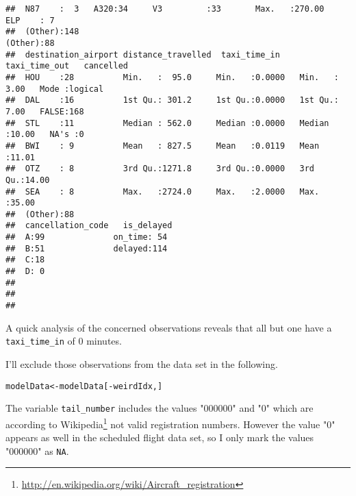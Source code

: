 \documentclass{article}\usepackage[]{graphicx}\usepackage[]{color}
\makeatletter
\newcommand{\hlopt}[1]{\textcolor[rgb]{0,0,0}{#1}}%
\newcommand{\hlstd}[1]{\textcolor[rgb]{0.345,0.345,0.345}{#1}}%
\newcommand{\hlkwb}[1]{\textcolor[rgb]{0.69,0.353,0.396}{#1}}%
\newenvironment{kframe}{%
 \def\at@end@of@kframe{}%
 \ifinner\ifhmode%
  \def\at@end@of@kframe{\end{minipage}}%
  \begin{minipage}{\columnwidth}%
 \fi\fi%
 \def\FrameCommand##1{\hskip\@totalleftmargin \hskip-\fboxsep
 \colorbox{shadecolor}{##1}\hskip-\fboxsep
     \hskip-\linewidth \hskip-\@totalleftmargin \hskip\columnwidth}%
 \MakeFramed {\advance\hsize-\width
   \@totalleftmargin\z@ \linewidth\hsize
   \@setminipage}}%
 {\par\unskip\endMakeFramed%
 \at@end@of@kframe}
\newenvironment{knitrout}{}{} %
\makeatother
\begin{document}
\begin{knitrout}
\begin{kframe}
\begin{verbatim}
##  N87    :  3   A320:34     V3         :33       Max.   :270.00   ELP    : 7    
##  (Other):148                                                     (Other):88    
##  destination_airport distance_travelled  taxi_time_in    taxi_time_out   cancelled      
##  HOU    :28          Min.   :  95.0     Min.   :0.0000   Min.   : 3.00   Mode :logical  
##  DAL    :16          1st Qu.: 301.2     1st Qu.:0.0000   1st Qu.: 7.00   FALSE:168      
##  STL    :11          Median : 562.0     Median :0.0000   Median :10.00   NA's :0        
##  BWI    : 9          Mean   : 827.5     Mean   :0.0119   Mean   :11.01                  
##  OTZ    : 8          3rd Qu.:1271.8     3rd Qu.:0.0000   3rd Qu.:14.00                  
##  SEA    : 8          Max.   :2724.0     Max.   :2.0000   Max.   :35.00                  
##  (Other):88                                                                             
##  cancellation_code   is_delayed 
##  A:99              on_time: 54  
##  B:51              delayed:114  
##  C:18                           
##  D: 0                           
##                                 
##                                 
## 
\end{verbatim}
\end{kframe}
\end{knitrout}
A quick analysis of the concerned observations reveals that all but one have a \verb+taxi_time_in+ of 0 minutes.

I'll exclude those observations from the data set in the following.
\begin{knitrout}
\color{fgcolor}\begin{kframe}
\begin{alltt}
\hlstd{modelData} \hlkwb{<-} \hlstd{modelData[}\hlopt{-}\hlstd{weirdIdx,]}
\end{alltt}
\end{kframe}
\end{knitrout}

The variable \verb+tail_number+ includes the values "000000" and "0" which are according to Wikipedia\footnote{\url{http://en.wikipedia.org/wiki/Aircraft_registration}} not valid registration numbers. However the value "0" appears as well in the scheduled flight data set, so I only mark the values "000000" as \verb+NA+.
\end{document}
